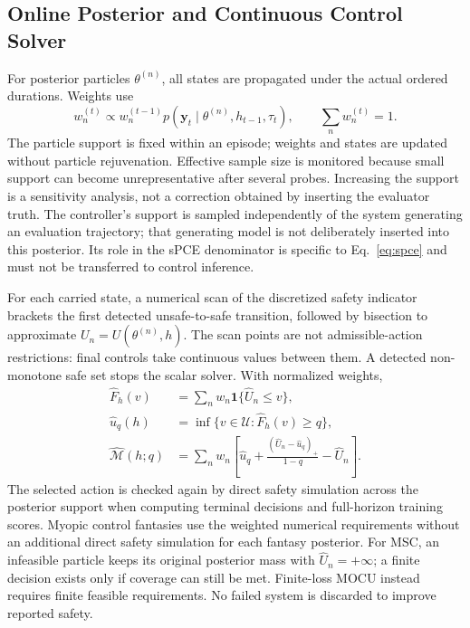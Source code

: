 \documentclass[journal]{IEEEtran}
\begin{document}
\subsection{Online Posterior and Continuous Control Solver}
For posterior particles $\theta^{(n)}$, all states are propagated under the
actual ordered durations. Weights use
\begin{equation}
w_n^{(t)}\propto w_n^{(t-1)}
p(\mathbf y_t\mid\theta^{(n)},h_{t-1},\tau_t),\qquad \sum_nw_n^{(t)}=1.
\label{eq:particle-update}
\end{equation}
The particle support is fixed within an episode; weights and states are updated without particle rejuvenation. Effective sample size is monitored because small support can become unrepresentative after several probes. Increasing the support is a sensitivity analysis, not a correction obtained by inserting the evaluator truth.
The controller's support is sampled independently of the system generating
an evaluation trajectory; that generating model is not deliberately inserted
into this posterior. Its role in the sPCE denominator is specific to
Eq.~\eqref{eq:spce} and must not be transferred to control inference.

For each carried state, a numerical scan of the discretized safety indicator
brackets the first detected
unsafe-to-safe transition, followed by bisection to approximate
$U_n=U(\theta^{(n)},h)$. The scan points are not admissible-action restrictions:
final controls take continuous values between them. A detected non-monotone
safe set stops the scalar solver. With normalized weights,
\begin{align}
\widehat F_h(v)&=\sum_n w_n\mathbf1\{\widehat U_n\le v\},\\
\widehat u_q(h)&=\inf\{v\in\mathcal U:\widehat F_h(v)\ge q\},\\
\widehat{\mathcal M}(h;q)&=\sum_nw_n
\left[\widehat u_q+\frac{(\widehat U_n-\widehat u_q)_+}{1-q}-\widehat U_n\right].
\label{eq:particle-objectives}
\end{align}
The selected action is checked again by direct safety simulation across the
posterior support when computing terminal decisions and full-horizon training
scores. Myopic control fantasies use the weighted numerical requirements
without an additional direct safety simulation for each fantasy posterior. For MSC, an infeasible particle keeps its original
posterior mass with $\widehat U_n=+\infty$; a finite decision exists only if
coverage can still be met. Finite-loss MOCU instead requires finite feasible
requirements. No failed system is discarded to improve reported safety.
\end{document}
